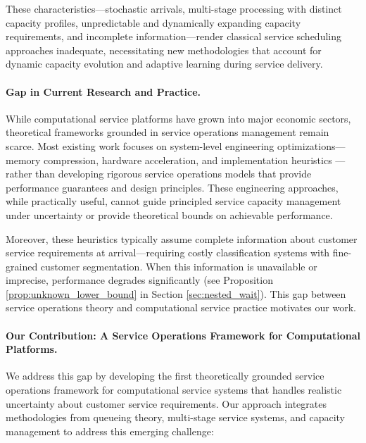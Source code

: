 \documentclass[poms,final,blindrev]{poms1_V1} %
\begin{document}
These characteristics—stochastic arrivals, multi-stage processing with distinct capacity profiles, unpredictable and dynamically expanding capacity requirements, and incomplete information—render classical service scheduling approaches inadequate, necessitating new methodologies that account for dynamic capacity evolution and adaptive learning during service delivery.

\paragraph{Gap in Current Research and Practice.}
While computational service platforms have grown into major economic sectors, theoretical frameworks grounded in service operations management remain scarce. Most existing work focuses on system-level engineering optimizations—memory compression, hardware acceleration, and implementation heuristics \citep{yu2022orca, kwon2023efficient, agrawal2023sarathi, pope2023efficiently, deepseekai2024deepseekv2strongeconomicalefficient, patel2024splitwise, zhong2024distserve}—rather than developing rigorous service operations models that provide performance guarantees and design principles. These engineering approaches, while practically useful, cannot guide principled service capacity management under uncertainty or provide theoretical bounds on achievable performance.

Moreover, these heuristics typically assume complete information about customer service requirements at arrival—requiring costly classification systems with fine-grained customer segmentation. When this information is unavailable or imprecise, performance degrades significantly (see Proposition \ref{prop:unknown_lower_bound} in Section \ref{sec:nested_wait}). This gap between service operations theory and computational service practice motivates our work.

\paragraph{Our Contribution: A Service Operations Framework for Computational Platforms.}
We address this gap by developing the first theoretically grounded service operations framework for computational service systems that handles realistic uncertainty about customer service requirements. Our approach integrates methodologies from queueing theory, multi-stage service systems, and capacity management to address this emerging challenge:
\end{document}
